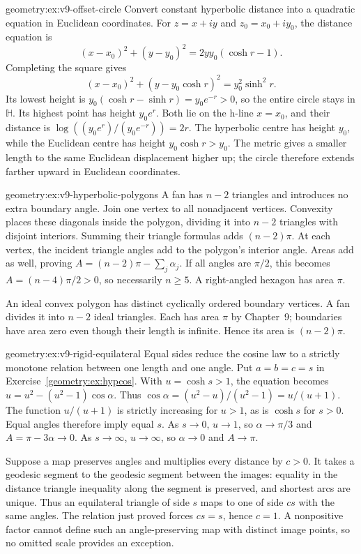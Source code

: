 \begin{solution}{geometry:ex:v9-offset-circle}
\idea Convert constant hyperbolic distance into a quadratic equation in
Euclidean coordinates.
\writeup For $z=x+iy$ and $z_0=x_0+iy_0$, the distance equation is
\[
 (x-x_0)^2+(y-y_0)^2=2yy_0(\cosh r-1).
\]
Completing the square gives
\[
 (x-x_0)^2+(y-y_0\cosh r)^2=y_0^2\sinh^2r.
\]
Its lowest height is $y_0(\cosh r-\sinh r)=y_0e^{-r}>0$,
so the entire circle stays in $\mathbb H$.
Its highest point has height $y_0e^r$. Both lie on the h-line $x=x_0$,
and their distance is
$\log((y_0e^r)/(y_0e^{-r}))=2r$.
The hyperbolic centre has height $y_0$, while the Euclidean centre has
height $y_0\cosh r>y_0$. The metric gives a smaller length to the same
Euclidean displacement higher up; the circle therefore extends farther
upward in Euclidean coordinates.
\end{solution}
\begin{solution}{geometry:ex:v9-hyperbolic-polygons}
\idea A fan has $n-2$ triangles and introduces no extra boundary angle.
\writeup Join one vertex to all nonadjacent vertices.
Convexity places these diagonals inside the polygon, dividing it into
$n-2$ triangles with disjoint interiors. Summing their triangle formulas
adds $(n-2)\pi$. At each vertex, the incident triangle angles add to
the polygon's interior angle. Areas add as well, proving
$A=(n-2)\pi-\sum_j\alpha_j$.
If all angles are $\pi/2$, this becomes
$A=(n-4)\pi/2>0$, so necessarily $n\ge5$.
A right-angled hexagon has area $\pi$.

An ideal convex polygon has distinct cyclically ordered boundary
vertices. A fan divides it into $n-2$ ideal triangles. Each has area
$\pi$ by Chapter~9; boundaries have area zero even though their length
is infinite. Hence its area is $(n-2)\pi$.
\end{solution}
\begin{solution}{geometry:ex:v9-rigid-equilateral}
\idea Equal sides reduce the cosine law to a strictly monotone relation
between one length and one angle.
\writeup Put $a=b=c=s$ in Exercise~\ref{geometry:ex:hypcos}.
With $u=\cosh s>1$, the equation becomes
$u=u^2-(u^2-1)\cos\alpha$. Thus
$\cos\alpha=(u^2-u)/(u^2-1)=u/(u+1)$.
The function $u/(u+1)$ is strictly increasing for $u>1$, as is
$\cosh s$ for $s>0$. Equal angles therefore imply equal $s$.
As $s\to0$, $u\to1$, so $\alpha\to\pi/3$ and
$A=\pi-3\alpha\to0$. As $s\to\infty$, $u\to\infty$, so
$\alpha\to0$ and $A\to\pi$.

Suppose a map preserves angles and multiplies every distance by
$c>0$. It takes a geodesic segment to the geodesic segment between the
images: equality in the distance triangle inequality along the segment
is preserved, and shortest arcs are unique. Thus an equilateral triangle
of side $s$ maps to one of side $cs$ with the same angles.
The relation just proved forces $cs=s$, hence $c=1$.
A nonpositive factor cannot define such an angle-preserving map with
distinct image points, so no omitted scale provides an exception.
\end{solution}

